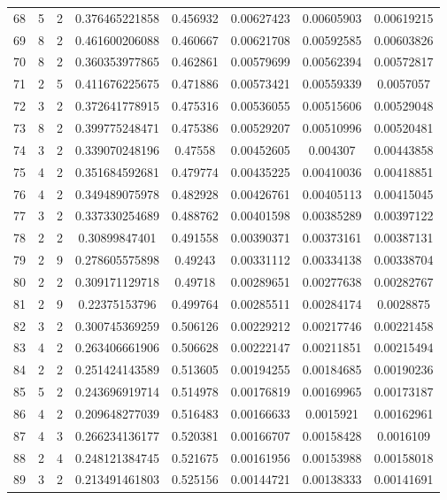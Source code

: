 \begin{longtable}{|c|c|c|c|c|c|c|c|}
68 & 5 & 2 & 0.376465221858 & 0.456932 & 0.00627423 & 0.00605903 & 0.00619215 \\
69 & 8 & 2 & 0.461600206088 & 0.460667 & 0.00621708 & 0.00592585 & 0.00603826 \\
70 & 8 & 2 & 0.360353977865 & 0.462861 & 0.00579699 & 0.00562394 & 0.00572817 \\
71 & 2 & 5 & 0.411676225675 & 0.471886 & 0.00573421 & 0.00559339 & 0.0057057 \\
72 & 3 & 2 & 0.372641778915 & 0.475316 & 0.00536055 & 0.00515606 & 0.00529048 \\
73 & 8 & 2 & 0.399775248471 & 0.475386 & 0.00529207 & 0.00510996 & 0.00520481 \\
74 & 3 & 2 & 0.339070248196 & 0.47558 & 0.00452605 & 0.004307 & 0.00443858 \\
75 & 4 & 2 & 0.351684592681 & 0.479774 & 0.00435225 & 0.00410036 & 0.00418851 \\
76 & 4 & 2 & 0.349489075978 & 0.482928 & 0.00426761 & 0.00405113 & 0.00415045 \\
77 & 3 & 2 & 0.337330254689 & 0.488762 & 0.00401598 & 0.00385289 & 0.00397122 \\
78 & 2 & 2 & 0.30899847401 & 0.491558 & 0.00390371 & 0.00373161 & 0.00387131 \\
79 & 2 & 9 & 0.278605575898 & 0.49243 & 0.00331112 & 0.00334138 & 0.00338704 \\
80 & 2 & 2 & 0.309171129718 & 0.49718 & 0.00289651 & 0.00277638 & 0.00282767 \\
81 & 2 & 9 & 0.22375153796 & 0.499764 & 0.00285511 & 0.00284174 & 0.0028875 \\
82 & 3 & 2 & 0.300745369259 & 0.506126 & 0.00229212 & 0.00217746 & 0.00221458 \\
83 & 4 & 2 & 0.263406661906 & 0.506628 & 0.00222147 & 0.00211851 & 0.00215494 \\
84 & 2 & 2 & 0.251424143589 & 0.513605 & 0.00194255 & 0.00184685 & 0.00190236 \\
85 & 5 & 2 & 0.243696919714 & 0.514978 & 0.00176819 & 0.00169965 & 0.00173187 \\
86 & 4 & 2 & 0.209648277039 & 0.516483 & 0.00166633 & 0.0015921 & 0.00162961 \\
87 & 4 & 3 & 0.266234136177 & 0.520381 & 0.00166707 & 0.00158428 & 0.0016109 \\
88 & 2 & 4 & 0.248121384745 & 0.521675 & 0.00161956 & 0.00153988 & 0.00158018 \\
89 & 3 & 2 & 0.213491461803 & 0.525156 & 0.00144721 & 0.00138333 & 0.00141691 \\

\end{longtable}
